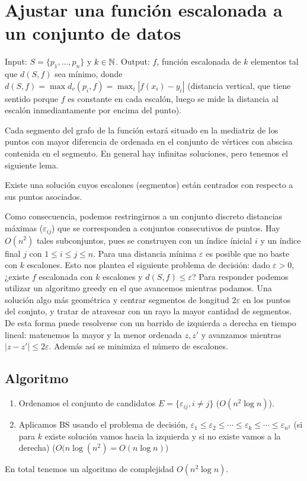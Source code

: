 \documentclass[TGyGC.tex]{subfiles}
\begin{document}
\section{Ajustar una función escalonada a un conjunto de datos}
Input: $S=\{p_1,\dots, p_n\}$ y $k\in\mathbb{N}$. Output: $f$, función escalonada de $k$ elementos tal que $d(S,f)$ sea mínimo, donde $d(S,f)=\max d_v(p_i,f)=\max_i|f(x_i)-y_i|$ (distancia vertical, que tiene sentido porque $f$ es constante en cada escalón, luego se mide la distancia al escalón inmediantamente por encima del punto). 

Cada segmento del grafo de la función estará situado en la mediatriz de los puntos con mayor diferencia de ordenada en el conjunto de vértices con abscisa contenida en el segmento. En general hay infinitas soluciones, pero tenemos el siguiente lema.

\begin{lemma}
Existe una solución cuyos escalones (segmentos) están centrados con respecto a sus puntos asociados. 
\end{lemma}

Como consecuencia, podemos restringirnos a un conjunto discreto distancias máximas ($\varepsilon_{ij}$) que se corresponden a conjuntos consecutivos de puntos. Hay $O(n^2)$ tales subconjuntos, pues se construyen con un índice ínicial $i$ y un índice final $j$ con $1\leq i\leq j\leq n$. Para una distancia mínima $\varepsilon$ es posible que no baste con $k$ escalones. Esto nos plantea el siguiente problema de decisión: dado $\varepsilon>0$, ¿existe $f$ escalonada con $k$ escalones y $d(S,f)\leq\varepsilon$? Para responder podemos utilizar un algoritmo greedy en el que avancemos mientras podamos. Una solución algo más geométrica y centrar segmentos de longitud $2\varepsilon$ en los puntos del conjnto, y tratar de atravesar con un rayo la mayor cantidad de segmentos. De esta forma puede resolverse con un barrido de izquierda a derecha en tiempo lineal: matenemos la mayor y la menor ordenada $z,z'$ y avanzamos mientras $|z-z'|\leq 2\varepsilon$. Además así se minimiza el número de escalones.

\subsection{Algoritmo}
\begin{enumerate}
\item Ordenamos el conjunto de candidatos $E=\{\varepsilon_{ij}, i\neq j\}$ ($O(n^2\log n)$).
\item Aplicamos BS usando el problema de decisión, $\varepsilon_1\leq\varepsilon_2\leq\cdots\leq\varepsilon_k\leq\cdots\leq\varepsilon_{n^2}$ (si para $k$ existe solución vamos hacia la izquierda y si no existe vamos a la derecha) ($O(n\log(n^2)=O(n\log n)$)
\end{enumerate}
En total tenemos un algoritmo de complejidad $O(n^2\log n)$. 
\end{document}

